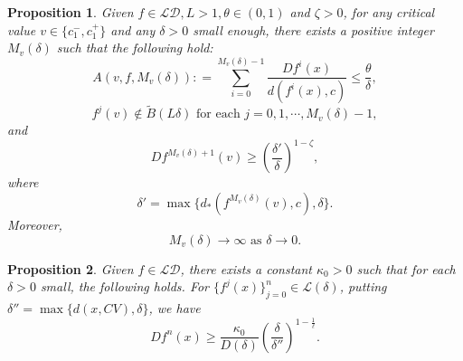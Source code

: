 \documentclass[11pt,oneside]{article}
\theoremstyle{plain}
\newtheorem{prop}{Proposition}
\numberwithin{equation}{section}
\numberwithin{figure}{section}
\numberwithin{table}{section}
\begin{document}
\begin{prop}

Given $f \in \mathcal{LD}, L > 1, \theta \in (0, 1)$ and $\zeta > 0$, for any critical value $v \in \{c_1^-, c_1^+ \}$ and any $\delta > 0$ small enough, there exists a positive integer $M_v(\delta)$ such that the following hold:
\begin{equation}
A(v, f, M_v(\delta)) : = \sum_{i=0}^{M_v(\delta) -1} \frac{Df^i (x)}{d(f^i(x), c) } \leq \frac{\theta}{\delta}, 
\end{equation}
\begin{equation}
f^j (v) \notin \tilde B(L \delta) \text{ for each } j = 0, 1, \cdots, M_v(\delta) -1, 
\end{equation}
and 
\begin{equation}
 Df^{M_v(\delta) +1} (v)  \geq \left( \frac{\delta'}{\delta} \right)^{1 - \zeta},  
\end{equation}
where 
\[
\delta' = \max\{ d_*(f^{M_v(\delta)}(v), c), \delta \}.
\]
Moreover, 
\begin{equation}
M_v(\delta) \to \infty \text{ as } \delta \to 0. 
\end{equation}

\end{prop}


\begin{prop}
Given $f \in \mathcal {LD}$, there exists a constant $\kappa_0 > 0$ such that for each $\delta > 0$ small, the following holds. For $\{f^j(x) \}_{j=0}^n \in \mathcal L(\delta)$, putting $\delta'' = \max\{ d(x, CV), \delta\}$, we have
\[
Df^n (x) \geq \frac{\kappa_0}{D(\delta)} \left(\frac{\delta}{\delta''} \right)^{1 - \frac{1}{\ell}}.
\]
\end{prop}
\end{document}
